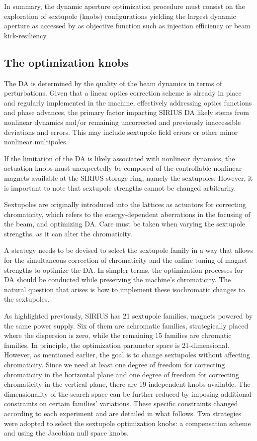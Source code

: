 In summary, the dynamic aperture optimization procedure must consist on the exploration of sextupole (knobs) configurations yielding the largest dynamic aperture as accessed by as objective function such as injection efficiency or beam kick-resiliency.

\subsection{The optimization knobs}
\label{subsec:knobs}
The \gls*{DA} is determined by the quality of the beam dynamics in terms of perturbations. Given that a linear optics correction scheme is already in place and regularly implemented in the machine, effectively addressing optics functions and phase advances, the primary factor impacting SIRIUS \gls*{DA} likely stems from nonlinear dynamics and/or remaining uncorrected and previously inaccessible deviations and errors. This may include sextupole field errors or other minor nonlinear multipoles.

If the limitation of the \gls*{DA} is likely associated with nonlinear dynamics, the actuation knobs must unexpectedly be composed of the controllable nonlinear magnets available at the SIRIUS storage ring, namely the sextupoles. However, it is important to note that sextupole strengths cannot be changed arbitrarily.

Sextupoles are originally introduced into the lattices as actuators for correcting chromaticity, which refers to the energy-dependent aberrations in the focusing of the beam, and optimizing \gls*{DA}. Care must be taken when varying the sextupole strengths, as it can alter the chromaticity.

A strategy needs to be devised to select the sextupole family in a way that allows for the simultaneous correction of chromaticity and the online tuning of magnet strengths to optimize the \gls*{DA}. In simpler terms, the optimization processes for \gls*{DA} should be conducted while preserving the machine's chromaticity. The natural question that arises is how to implement these isochromatic changes to the sextupoles.

As highlighted previously, SIRIUS has 21 sextupole families, magnets powered by the same power supply. Six of them are achromatic families, strategically placed where the dispersion is zero, while the remaining 15 families are chromatic families. In principle, the optimization parameter space is 21-dimensional. However, as mentioned earlier, the goal is to change sextupoles without affecting chromaticity. Since we need at least one degree of freedom for correcting chromaticity in the horizontal plane and one degree of freedom for correcting chromaticity in the vertical plane, there are 19 independent knobs available. The dimensionality of the search space can be further reduced by imposing additional constraints on certain families' variations. These specific constraints changed according to each experiment and are detailed in what follows. Two strategies were adopted to select the sextupole optimization knobs: a compensation scheme and using the Jacobian null space knobs.

